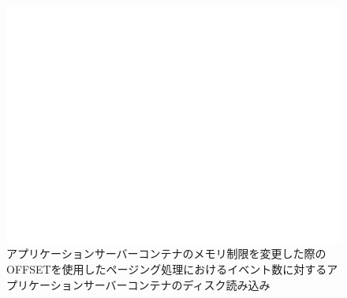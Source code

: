 \documentclass[../../../../../main]{subfiles}
\begin{document}
    \begin{figure}[H]
        \centering
        \includegraphics[width=12cm]{graph}
        \caption{アプリケーションサーバーコンテナのメモリ制限を変更した際のOFFSETを使用したページング処理におけるイベント数に対するアプリケーションサーバーコンテナのディスク読み込み}
        \label{fig:paging-offset-change-app-memory-limit-app-disk-out-app_4_db_1_1024}
    \end{figure}
\end{document}
